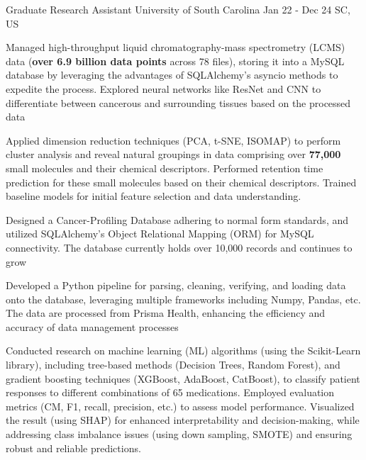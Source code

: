 
\vspace*{-0.2cm}

\begin{cventries}
    \cventry
        {Graduate Research Assistant} %
        {University of South Carolina} %
        {Jan 22 - Dec 24}
        {SC, US} %
        {
            \begin{cvitemsfree} %
                \item{Managed high-throughput liquid chromatography-mass spectrometry (LCMS) data (\textbf{over 6.9 billion data points} across 78 files), storing it into a MySQL database by leveraging the advantages of SQLAlchemy's asyncio methods to expedite the process. Explored neural networks like ResNet and CNN to differentiate between cancerous and surrounding tissues based on the processed data}
                \item{Applied dimension reduction techniques (PCA, t-SNE, ISOMAP) to perform cluster analysis and reveal natural groupings in data comprising over \textbf{77,000} small molecules and their chemical descriptors. Performed retention time prediction for these small molecules based on their chemical descriptors. Trained baseline models for initial feature selection and data understanding.}
                \item{Designed a Cancer-Profiling Database adhering to normal form standards, and utilized SQLAlchemy's Object Relational Mapping (ORM) for MySQL connectivity. The database currently holds over 10,000 records and continues to grow}
                \item{Developed a Python pipeline for parsing, cleaning, verifying, and loading data onto the database, leveraging multiple frameworks including Numpy, Pandas, etc. The data are processed from Prisma Health, enhancing the efficiency and accuracy of data management processes}
                \item{Conducted research on machine learning (ML) algorithms (using the Scikit-Learn library), including tree-based methods (Decision Trees, Random Forest), and gradient boosting techniques (XGBoost, AdaBoost, CatBoost), to classify patient responses to different combinations of 65 medications. Employed evaluation metrics (CM, F1, recall, precision, etc.) to assess model performance. Visualized the result (using SHAP) for enhanced interpretability and decision-making, while addressing class imbalance issues (using down sampling, SMOTE) and ensuring robust and reliable predictions.}

\end{cvitemsfree}}
\end{cventries}
